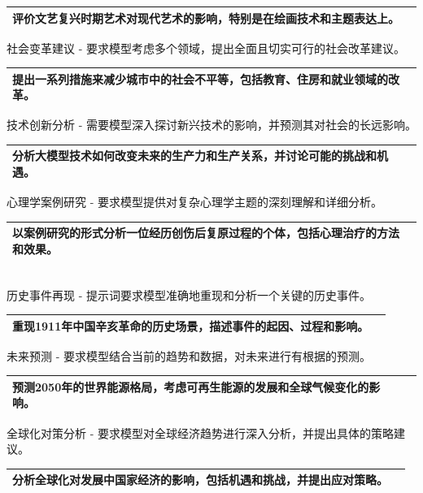 \documentclass[12pt]{book}
\begin{document}
\begin{tabular}{|p{15cm}|p{3cm}|}
	\hline
评价文艺复兴时期艺术对现代艺术的影响，特别是在绘画技术和主题表达上。\\
	\hline
\end{tabular}


\bigskip
社会变革建议  - 要求模型考虑多个领域，提出全面且切实可行的社会改革建议。

\begin{tabular}{|p{15cm}|p{3cm}|}
	\hline
提出一系列措施来减少城市中的社会不平等，包括教育、住房和就业领域的改革。\\
	\hline
\end{tabular}


\bigskip
技术创新分析  - 需要模型深入探讨新兴技术的影响，并预测其对社会的长远影响。

\begin{tabular}{|p{15cm}|p{3cm}|}
	\hline
分析大模型技术如何改变未来的生产力和生产关系，并讨论可能的挑战和机遇。\\
	\hline
\end{tabular}


\bigskip
心理学案例研究  - 要求模型提供对复杂心理学主题的深刻理解和详细分析。

\begin{tabular}{|p{15cm}|p{3cm}|}
	\hline
以案例研究的形式分析一位经历创伤后复原过程的个体，包括心理治疗的方法和效果。\\
	\hline
\end{tabular}\\


\bigskip
历史事件再现  - 提示词要求模型准确地重现和分析一个关键的历史事件。

\begin{tabular}{|p{15cm}|p{3cm}|}
	\hline
重现1911年中国辛亥革命的历史场景，描述事件的起因、过程和影响。\\
	\hline
\end{tabular}


\bigskip
未来预测  - 要求模型结合当前的趋势和数据，对未来进行有根据的预测。

\begin{tabular}{|p{15cm}|p{3cm}|}
	\hline
预测2050年的世界能源格局，考虑可再生能源的发展和全球气候变化的影响。\\
	\hline
\end{tabular}


\bigskip
全球化对策分析  - 要求模型对全球经济趋势进行深入分析，并提出具体的策略建议。

\begin{tabular}{|p{15cm}|p{3cm}|}
	\hline
分析全球化对发展中国家经济的影响，包括机遇和挑战，并提出应对策略。\\
	\hline
\end{tabular}
\end{document}
